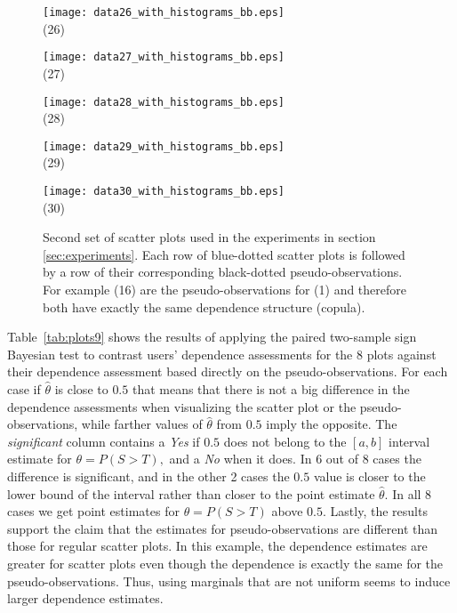 \documentclass[journal]{vgtc}                %
\begin{document}
\begin{figure*}[ht!]
  \begin{minipage}{0.19\textwidth}
   \centering
     \texttt{[image: data26\_with\_histograms\_bb.eps]}\\
     \footnotesize (26)
  \end{minipage}
  \hfill
  \begin{minipage}{0.19\textwidth}
   \centering
     \texttt{[image: data27\_with\_histograms\_bb.eps]}\\
     \footnotesize (27)
  \end{minipage}
  \hfill
  \begin{minipage}{0.19\textwidth}
   \centering
     \texttt{[image: data28\_with\_histograms\_bb.eps]}\\
     \footnotesize (28)
  \end{minipage}
  \hfill
  \begin{minipage}{0.19\textwidth}
   \centering
     \texttt{[image: data29\_with\_histograms\_bb.eps]}\\
     \footnotesize (29)
  \end{minipage}
  \hfill
  \begin{minipage}{0.19\textwidth}
   \centering
     \texttt{[image: data30\_with\_histograms\_bb.eps]}\\
     \footnotesize (30)
  \end{minipage}  
  \caption{Second set of scatter plots used in the experiments in section \ref{sec:experiments}. Each row of blue-dotted scatter plots is followed by a row of their corresponding black-dotted pseudo-observations. For example (16) are the pseudo-observations for (1) and therefore both have exactly the same dependence structure (copula).}
\label{fig:6x5}
\end{figure*}

 Table~\ref{tab:plots9} shows the results of applying the paired two-sample sign Bayesian test to contrast users' dependence assessments for the 8 plots against their dependence assessment based directly on the pseudo-observations. For each case if $\hat{\theta}$ is close to $0.5$ that means that there is not a big difference in the dependence assessments when visualizing the scatter plot or the pseudo-observations, while farther values of $\hat{\theta}$ from $0.5$ imply the opposite. The \textit{significant} column contains a \textit{Yes} if $0.5$ does not belong to the $[a,b]$ interval estimate for $\theta=P(S>T),$ and a \textit{No} when it does. In 6 out of 8 cases the difference is significant, and in the other 2 cases the $0.5$ value is closer to the lower bound of the interval rather than closer to the point estimate $\hat{\theta}.$ In all 8 cases we get point estimates for $\theta=P(S>T)$ above $0.5$. Lastly, the results support the claim that the estimates for pseudo-observations are different than those for regular scatter plots. In this example, the dependence estimates are greater for scatter plots even though the dependence is exactly the same for the pseudo-observations. Thus, using marginals that are not uniform seems to induce larger dependence estimates.
\end{document}
